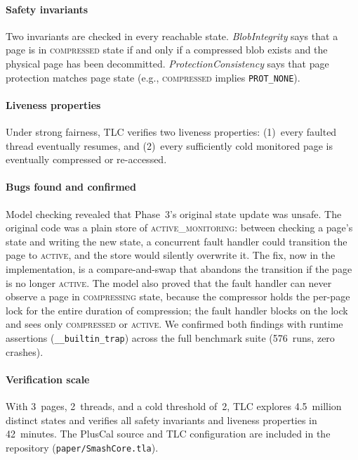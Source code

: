 \paragraph{Safety invariants}  Two invariants are checked in every
reachable state.  \emph{BlobIntegrity} says that a page is in
\textsc{compressed} state if and only if a compressed blob exists
and the physical page has been decommitted.
\emph{ProtectionConsistency} says that page protection matches
page state (e.g., \textsc{compressed} implies
\texttt{PROT\_NONE}).

\paragraph{Liveness properties}  Under strong fairness, TLC verifies
two liveness properties: (1)~every faulted thread eventually resumes,
and (2)~every sufficiently cold monitored page is eventually
compressed or re-accessed.

\paragraph{Bugs found and confirmed}  Model checking revealed that
Phase~3's original state update was unsafe.  The original code was
a plain store of \textsc{active\_monitoring}: between checking a
page's state and writing the new state, a concurrent fault handler
could transition the page to \textsc{active}, and the store would
silently overwrite it.  The fix, now in the implementation, is a compare-and-swap
that abandons the transition if the page is no longer \textsc{active}.
The model also proved that the fault handler can never observe a page
in \textsc{compressing} state, because the compressor holds the
per-page lock for the entire duration of compression; the fault
handler blocks on the lock and sees only \textsc{compressed} or
\textsc{active}.  We confirmed both findings with runtime assertions
(\texttt{\_\_builtin\_trap}) across the full benchmark suite (576~runs,
zero crashes).

\paragraph{Verification scale}  With 3~pages, 2~threads, and a
cold threshold of~2, TLC explores 4.5~million distinct states
and verifies all safety invariants and liveness properties in
42~minutes.  The PlusCal source and TLC configuration are included
in the repository (\texttt{paper/SmashCore.tla}).
